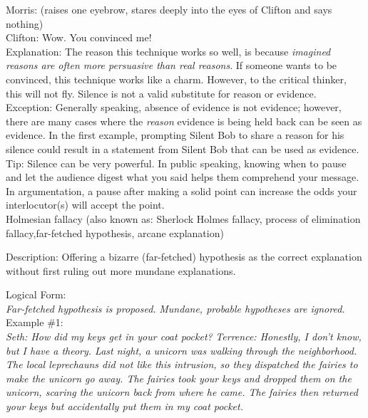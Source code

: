 \documentclass[a4paper,12pt,single,pdftex]{scrartcl}
\begin{document}
    
      Morris: (raises one eyebrow, stares deeply into the eyes of Clifton and says nothing)
    \\

    
      Clifton: Wow. You convinced me!
    \\

    
      Explanation: The reason this technique works so well, is because {\it imagined reasons are often more persuasive than real reasons}.  If someone wants to be convinced, this technique works like a charm.  However, to the critical thinker, this will not fly.  Silence is not a valid substitute for reason or evidence.
    \\

    
      Exception: Generally speaking, absence of evidence is not evidence; however, there are many cases where the {\it reason} evidence is being held back can be seen as evidence.  In the first example, prompting Silent Bob to share a reason for his silence could result in a statement from Silent Bob that can be used as evidence.
    \\

    
      Tip: Silence can be very powerful. In public speaking, knowing when to pause and let the audience digest what you said helps them comprehend your message. In argumentation, a pause after making a solid point can increase the odds your interlocutor(s) will accept the point.
    \\

  

Holmesian fallacy
    (also known as: Sherlock Holmes fallacy, process of elimination fallacy,far-fetched hypothesis, arcane explanation)
  
    Description: Offering a bizarre (far-fetched) hypothesis as the correct explanation without first ruling out more mundane explanations.

    
      Logical Form:
    \\

    
      {\em Far-fetched hypothesis is proposed.} \newline
{\em Mundane, probable hypotheses are ignored.}
    \\

    
      Example \#1:
    \\

    
      {\em Seth: How did my keys get in your coat pocket?} \newline
{\em Terrence: Honestly, I don’t know,  but I have a theory.  Last night, a unicorn was walking through the neighborhood.  The local leprechauns did not like this intrusion, so they dispatched the fairies to make the unicorn go away.  The fairies took your keys and dropped them on the unicorn, scaring the unicorn back from where he came.  The fairies then returned your keys but accidentally put them in my coat pocket.}
    \\
\end{document}
